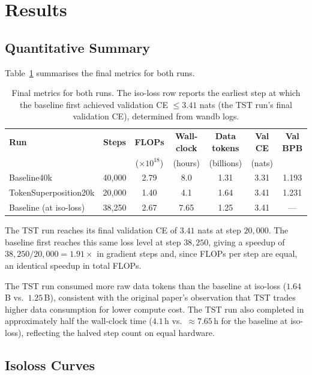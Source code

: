\documentclass{article}
\begin{document}
\section{Results}

\subsection{Quantitative Summary}

Table~\ref{tab:results} summarises the final metrics for both runs.

\begin{table}[h]
\centering
\begin{tabular}{lcccccc}
\toprule
\textbf{Run} & \textbf{Steps} & \textbf{FLOPs} & \textbf{Wall-clock} & \textbf{Data tokens} & \textbf{Val CE} & \textbf{Val BPB} \\
& & (×$10^{18}$) & (hours) & (billions) & (nats) & \\
\midrule
Baseline40k & 40{,}000 & 2.79 & 8.0 & 1.31 & 3.31 & 1.193 \\
TokenSuperposition20k & 20{,}000 & 1.40 & 4.1 & 1.64 & 3.41 & 1.231 \\
\midrule
Baseline (at iso-loss) & 38{,}250 & 2.67 & 7.65 & 1.25 & 3.41 & --- \\
\bottomrule
\end{tabular}
\caption{Final metrics for both runs. The iso-loss row reports the earliest step at
which the baseline first achieved validation CE $\leq 3.41$ nats (the TST run's final
validation CE), determined from wandb logs.}
\label{tab:results}
\end{table}

The TST run reaches its final validation CE of $3.41$ nats at step $20{,}000$.
The baseline first reaches this same loss level at step $38{,}250$, giving a
speedup of $38{,}250 / 20{,}000 = \mathbf{1.91\times}$ in gradient steps and,
since FLOPs per step are equal, an identical speedup in total FLOPs.

The TST run consumed more raw data tokens than the baseline at iso-loss
($1.64$\,B vs.\ $1.25$\,B), consistent with the original paper's
observation that TST trades higher data consumption for lower compute cost.
The TST run also completed in approximately half the wall-clock time ($4.1$\,h
vs.\ $\approx 7.65$\,h for the baseline at iso-loss), reflecting the halved
step count on equal hardware.

\subsection{Isoloss Curves}
\end{document}
